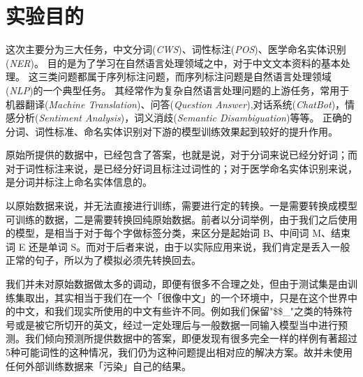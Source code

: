 \section{实验目的}
\label{sec:purpose}

这次主要分为三大任务，中文分词(\emph{CWS})、词性标注(\emph{POS})、医学命名实体识别(\emph{NER})。
目的是为了学习在自然语言处理领域之中，对于中文文本资料的基本处理。
这三类问题都属于序列标注问题，而序列标注问题是自然语言处理领域(\emph{NLP})的一个典型任务。
其经常作为复杂自然语言处理问题的上游任务，常用于机器翻译(\emph{Machine Translation})、问答(\emph{Question Answer}),对话系统(\emph{ChatBot})，情感分析(\emph{Sentiment Analysis})，词义消歧(\emph{Semantic Disambiguation})等等。
正确的分词、词性标准、命名实体识别对下游的模型训练效果起到较好的提升作用。

原始所提供的数据中，已经包含了答案，也就是说，对于分词来说已经分好词；而对于词性标注来说，是已经分好词且标注过词性的；对于医学命名实体识别来说，是分词并标注上命名实体信息的。

以原始数据来说，并无法直接进行训练，需要进行定的转换。一是需要转换成模型可训练的数据，二是需要转换回纯原始数据。前者以分词举例，由于我们之后使用的模型，是相当于对于每个字做标签分类，来区分是起始词 B、中间词 M、结束词 E 还是单词 S。而对于后者来说，由于以实际应用来说，我们肯定是丢入一般正常的句子，所以为了模拟必须先转换回去。

我们并未对原始数据做太多的调动，即便有很多不合理之处，但由于测试集是由训练集取出，其实相当于我们在一个「很像中文」的一个环境中，只是在这个世界中的中文，和我们现实所使用的中文有些许不同。例如我们保留"\$\$\_"之类的特殊符号或是被它所切开的英文，经过一定处理后与一般数据一同输入模型当中进行预测。我们倾向预测所提供数据中的答案，即便发现有很多完全一样的样例有著超过5种可能词性的这种情况，我们仍为这种问题提出相对应的解决方案。故并未使用任何外部训练数据来「污染」自己的结果。

